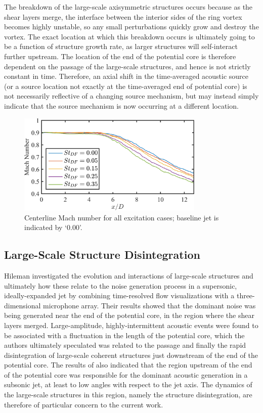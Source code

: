 The breakdown of the large-scale axisymmetric structures occurs because as the shear layers merge, the interface between the interior sides of the ring vortex becomes highly unstable, so any small perturbations quickly grow and destroy the vortex.
The exact location at which this breakdown occurs is ultimately going to be a function of structure growth rate, as larger structures will self-interact further upstream.
The location of the end of the potential core is therefore dependent on the passage of the large-scale structures, and hence is not strictly constant in time.
Therefore, an axial shift in the time-averaged acoustic source (or a source location not exactly at the time-averaged end of potential core) is not necessarily reflective of a changing source mechanism, but may instead simply indicate that the source mechanism is now occurring at a different location.
\begin{figure}
	\centering
	\includegraphics[width = 3.5in]{Figures/ch4_centerlineMach.png}
	\caption{Centerline Mach number for all excitation cases; baseline jet is indicated by `0.00'.}
	\label{fig:ch4_centerlinemach}
\end{figure}

\subsection{Large-Scale Structure Disintegration}
Hileman \etal \citep{Hileman2005} investigated the evolution and interactions of large-scale structures and ultimately how these relate to the noise generation process in a supersonic, ideally-expanded jet by combining time-resolved flow visualizations with a three-dimensional microphone array.
Their results showed that the dominant noise was being generated near the end of the potential core, in the region where the shear layers merged.
Large-amplitude, highly-intermittent acoustic events were found to be associated with a fluctuation in the length of the potential core, which the authors ultimately speculated was related to the passage and finally the rapid disintegration of large-scale coherent structures just downstream of the end of the potential core.
The results of  also indicated that the region upstream of the end of the potential core was responsible for the dominant acoustic generation in a subsonic jet, at least to low angles with respect to the jet axis.
The dynamics of the large-scale structures in this region, namely the structure disintegration, are therefore of particular concern to the current work.

